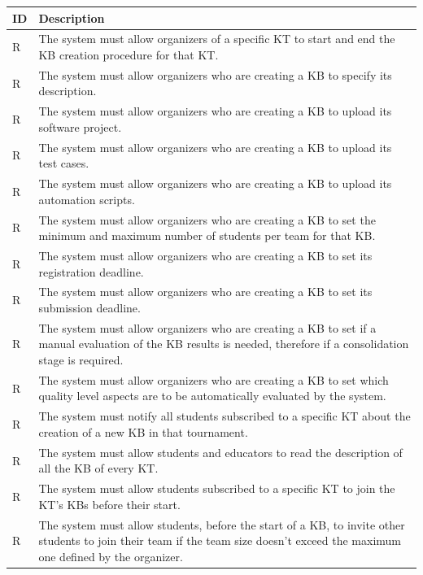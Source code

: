 \documentclass[11pt]{report}
\newcounter{rcounter}
\newcommand{\rc}{
    \addtocounter{rcounter}{1}
    R\arabic{rcounter}
}
\begin{document}
\begin{longtable}[h] {|p{10mm}|p{130mm}|}
    \hline
    \rowcolor{gray!20}
    \textbf{ID} & \textbf{Description} \\ \hline
    \rc & The system must allow organizers of a specific KT to start and end the KB creation procedure for that KT\@.
    \\ \hline
    \rc & The system must allow organizers who are creating a KB to specify its description.
    \\ \hline
    \rc & The system must allow organizers who are creating a KB to upload its software project.
    \\ \hline
    \rc & The system must allow organizers who are creating a KB to upload its test cases.
    \\ \hline
    \rc & The system must allow organizers who are creating a KB to upload its automation scripts.
    \\ \hline
    \rc & The system must allow organizers who are creating a KB to set the minimum and maximum number of students per team for that KB\@.
    \\ \hline
    \rc & The system must allow organizers who are creating a KB to set its registration deadline.
    \\ \hline
    \rc & The system must allow organizers who are creating a KB to set its submission deadline.
    \\ \hline
    \rc & The system must allow organizers who are creating a KB to set if a manual evaluation of the KB results is needed, therefore if a consolidation stage is required.
    \\ \hline
    \rc & The system must allow organizers who are creating a KB to set which quality level aspects are to be automatically evaluated by the system.
    \\ \hline
    \rc & The system must notify all students subscribed to a specific KT about the creation of a new KB in that tournament.
    \\ \hline
    \rc & The system must allow students and educators to read the description of all the KB of every KT\@.
    \\ \hline
    \rc & The system must allow students subscribed to a specific KT to join the KT's KBs before their start.
    \\ \hline
    \rc & The system must allow students, before the start of a KB, to invite other students to join their team if the team size doesn't exceed the maximum one defined by the organizer.
    \\ \hline
\end{longtable}
\end{document}
